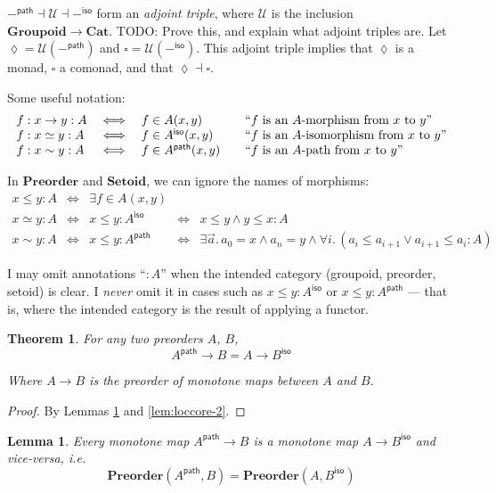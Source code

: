 \documentclass{article}
\newtheorem{theorem}{Theorem}
\newtheorem{lemma}{Lemma}
\newcommand{\todo}[1]{{\color{red}#1}}
\newcommand{\ms}[1]{\ensuremath{\mathsf{#1}}}
\newcommand{\mb}[1]{\ensuremath{\mathbf{#1}}}
\newcommand{\mc}[1]{\ensuremath{\mathcal{#1}}}
\newcommand{\binder}{.\,}
\newcommand{\bind}[1]{{#1}\binder}
\newcommand{\iso}{\ms{iso}}
\renewcommand{\path}{\ms{path}}
\newcommand{\isoto}{\simeq}
\newcommand{\pathto}{\sim}
\begin{document}
$-^\path \dashv \mc{U} \dashv -^\iso$ form an \emph{adjoint triple}, where
$\mc{U}$ is the inclusion $\mb{Groupoid} \to \mb{Cat}$. \todo{TODO:
  Prove this, and explain what adjoint triples are.}
%
Let $\lozenge = \mc{U}(-^\path)$ and $\square = \mc{U}(-^\iso)$. This adjoint
triple implies that $\lozenge$ is a monad, $\square$ a comonad, and that
$\lozenge \dashv \square$.

Some useful notation:
\[\begin{array}{lcl@{\hskip 2em}l}
  f : x \to y : A &\iff& f \in A(x,y)
  & \text{``$f$ is an $A$-morphism from $x$ to $y$''}\\
  f : x \simeq y : A &\iff& f \in A^\iso(x,y)
  & \text{``$f$ is an $A$-isomorphism from $x$ to $y$''}\\
  f : x \pathto y : A &\iff& f \in A^\path(x,y)
  & \text{``$f$ is an $A$-path from $x$ to $y$''}
\end{array}\]

In $\mb{Preorder}$ and $\mb{Setoid}$, we can ignore the names of morphisms:
\[\begin{array}{lclcl}
  x \le y : A &\iff& \exists f \in A(x,y)\\
  x \isoto y : A &\iff& x \le y : A^\iso &\iff& x \le y \wedge y \le x : A\\
  x \pathto y : A &\iff& x \le y : A^\path
  &\iff& \exists\bind{\vec{a}} a_0 = x \wedge a_n = y
  \wedge \forall\bind{i} (a_i \le a_{i+1} \vee a_{i+1} \le a_i : A)
\end{array}\]

I may omit annotations ``$: A$'' when the intended category (groupoid, preorder,
setoid) is clear. I \emph{never} omit it in cases such as $x \le y : A^\iso$ or
$x \le y : A^\path$ --- that is, where the intended category is the result of
applying a functor.

\begin{theorem}\label{thm:loccore} For any two preorders $A$, $B$,
  \begin{equation}
    A^\path \to B = A \to B^\iso
  \end{equation}

  Where $A \to B$ is the preorder of monotone maps between $A$ and $B$.
\end{theorem}

\begin{proof} By Lemmas \ref{lem:loccore-1} and \ref{lem:loccore-2}.
\end{proof}

\begin{lemma}\label{lem:loccore-1}
  Every monotone map $A^\path \to B$ is a monotone map $A \to B^\iso$ and
  vice-versa, i.e.
  \[ \mb{Preorder}(A^\path, B) = \mb{Preorder}(A, B^\iso) \]
\end{lemma}
\end{document}
